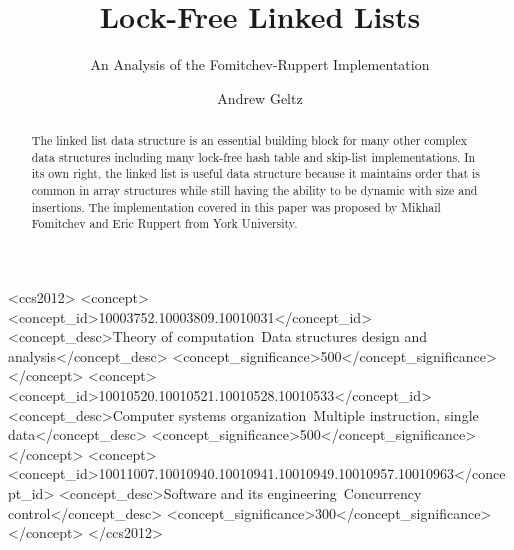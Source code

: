 \documentclass[manuscript,review,screen]{acmart}
\begin{document}
\title{Lock-Free Linked Lists}
 \subtitle{An Analysis of the Fomitchev-Ruppert Implementation}

\author{Andrew Geltz}

\renewcommand\shortauthors{Geltz, A.}

\begin{abstract}
The linked list data structure is an essential building block for many other complex data structures including many lock-free hash table and skip-list implementations. In its own right, the linked list is useful data structure because it maintains order that is common in array structures while still having the ability to be dynamic with size and insertions. The implementation covered in this paper was proposed by Mikhail Fomitchev and Eric Ruppert from York University. 
\end{abstract}


%
%
\begin{CCSXML}
<ccs2012>
	<concept>
		<concept_id>10003752.10003809.10010031</concept_id>
		<concept_desc>Theory of computation~Data structures design and analysis</concept_desc>
		<concept_significance>500</concept_significance>
	</concept>
	<concept>
		<concept_id>10010520.10010521.10010528.10010533</concept_id>
		<concept_desc>Computer systems organization~Multiple instruction, single data</concept_desc>
		<concept_significance>500</concept_significance>
	</concept>
	<concept>
		<concept_id>10011007.10010940.10010941.10010949.10010957.10010963</concept_id>
		<concept_desc>Software and its engineering~Concurrency control</concept_desc>
		<concept_significance>300</concept_significance>
	</concept>
</ccs2012>
\end{CCSXML}


%
%




\maketitle



\end{document}
